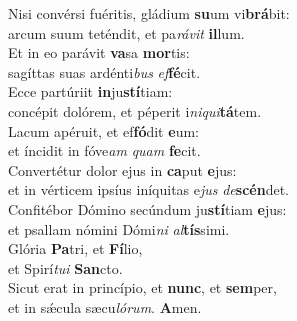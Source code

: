 \oddverse Nisi convérsi fuéritis, gládium \textbf{su}um vi\textbf{brá}bit:~\*\\
\oddverse arcum suum teténdit, et pa\textit{rá}\textit{vit} \textbf{il}lum.\\
\evenverse Et in eo parávit \textbf{va}sa \textbf{mor}tis:~\*\\
\evenverse sagíttas suas ardénti\textit{bus} \textit{ef}\textbf{fé}cit.\\
\oddverse Ecce partúriit \textbf{in}ju\textbf{stí}tiam:~\*\\
\oddverse concépit dolórem, et péperit i\textit{ni}\textit{qui}\textbf{tá}tem.\\
\evenverse Lacum apéruit, et ef\textbf{fó}dit \textbf{e}um:~\*\\
\evenverse et íncidit in fóve\textit{am} \textit{quam} \textbf{fe}cit.\\
\oddverse Convertétur dolor ejus in \textbf{ca}put \textbf{e}jus:~\*\\
\oddverse et in vérticem ipsíus iníquitas e\textit{jus} \textit{de}\textbf{scén}det.\\
\evenverse Confitébor Dómino secúndum ju\textbf{stí}tiam \textbf{e}jus:~\*\\
\evenverse et psallam nómini Dómi\textit{ni} \textit{al}\textbf{tís}simi.\\
\oddverse Glória \textbf{Pa}tri, et \textbf{Fí}lio,~\*\\
\oddverse et Spirí\textit{tu}\textit{i} \textbf{San}cto.\\
\evenverse Sicut erat in princípio, et \textbf{nunc}, et \textbf{sem}per,~\*\\
\evenverse et in sǽcula sæcu\textit{ló}\textit{rum}. \textbf{A}men.\\
